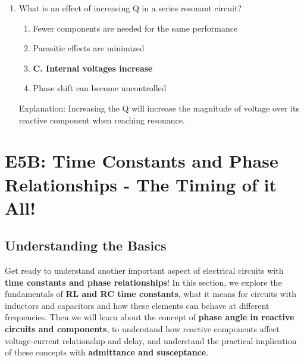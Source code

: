 \begin{enumerate}
    \item What is an effect of increasing Q in a series resonant circuit?
      \begin{enumerate}
       \item  Fewer components are needed for the same performance
      \item  Parasitic effects are minimized
       \item \textbf{C. Internal voltages increase}
        \item  Phase shift can become uncontrolled
        \end{enumerate}
        \textcolor{myred}{Explanation:}
        Increasing the Q will increase the magnitude of voltage over its reactive component when reaching resonance.
\end{enumerate}

\section{E5B: Time Constants and Phase Relationships - The Timing of it All!}

\subsection*{Understanding the Basics}
Get ready to understand another important aspect of electrical circuits with \textcolor{myblue}{\textbf{time constants and phase relationships}}! In this section, we explore the fundamentals of \textcolor{myblue}{\textbf{RL and RC time constants}}, what it means for circuits with inductors and capacitors and how these elements can behave at different frequencies. Then we will learn about the concept of \textcolor{myblue}{\textbf{phase angle in reactive circuits and components}}, to understand how reactive components affect voltage-current relationship and delay, and understand the practical implication of these concepts with \textcolor{myblue}{\textbf{admittance and susceptance}}.


